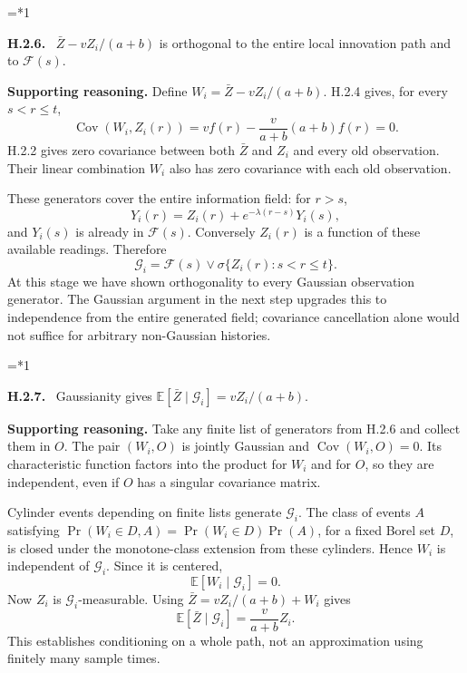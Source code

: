 \documentclass[12pt,letterpaper]{article}
\newcommand{\E}{\mathbb E}
\newcommand{\Cov}{\operatorname{Cov}}
\newcommand{\G}{\mathcal G}
\newcommand{\F}{\mathcal F}
\newenvironment{proofstep}[2]{%
  \begin{list}{}{\leftmargin=\dimexpr 0.17in*#2\relax%
  \setlength{\rightmargin}{0pt}\setlength{\topsep}{5pt}\setlength{\parsep}{2pt}}%
  \item[]\textbf{\textcolor{ink}{#1.}}\ }{\end{list}}
\begin{document}
\begin{proofstep}{H.2.6}{1}
\label{step:H.2.6}
$\bar Z-vZ_i/(a+b)$ is orthogonal to the entire local innovation path and to $\mathcal F(s)$.

\textbf{Supporting reasoning.}
Define $W_i=\bar Z-vZ_i/(a+b)$. H.2.4 gives, for every $s<r\le t$,
\[
\Cov(W_i,Z_i(r))=vf(r)-\frac{v}{a+b}(a+b)f(r)=0.
\]
H.2.2 gives zero covariance between both $\bar Z$ and $Z_i$ and every old observation. Their linear combination $W_i$ also has zero covariance with each old observation.

These generators cover the entire information field: for $r>s$,
\[
Y_i(r)=Z_i(r)+e^{-\lambda(r-s)}Y_i(s),
\]
and $Y_i(s)$ is already in $\F(s)$. Conversely $Z_i(r)$ is a function of these available readings. Therefore
\[
\G_i=\F(s)\vee\sigma\{Z_i(r):s<r\le t\}.
\]
At this stage we have shown orthogonality to every Gaussian observation generator. The Gaussian argument in the next step upgrades this to independence from the entire generated field; covariance cancellation alone would not suffice for arbitrary non-Gaussian histories.
\par{}
\end{proofstep}

\begin{proofstep}{H.2.7}{1}
\label{step:H.2.7}
Gaussianity gives $\E[\bar Z\mid\mathcal G_i]=vZ_i/(a+b)$.

\textbf{Supporting reasoning.}
Take any finite list of generators from H.2.6 and collect them in $O$. The pair $(W_i,O)$ is jointly Gaussian and $\Cov(W_i,O)=0$. Its characteristic function factors into the product for $W_i$ and for $O$, so they are independent, even if $O$ has a singular covariance matrix.

Cylinder events depending on finite lists generate $\G_i$. The class of events $A$ satisfying $\Pr(W_i\in D,A)=\Pr(W_i\in D)\Pr(A)$, for a fixed Borel set $D$, is closed under the monotone-class extension from these cylinders. Hence $W_i$ is independent of $\G_i$. Since it is centered,
\[
\E[W_i\mid\G_i]=0.
\]
Now $Z_i$ is $\G_i$-measurable. Using $\bar Z=vZ_i/(a+b)+W_i$ gives
\[
\E[\bar Z\mid\G_i]=\frac{v}{a+b}Z_i.
\]
This establishes conditioning on a whole path, not an approximation using finitely many sample times.
\par{}
\end{proofstep}
\end{document}
